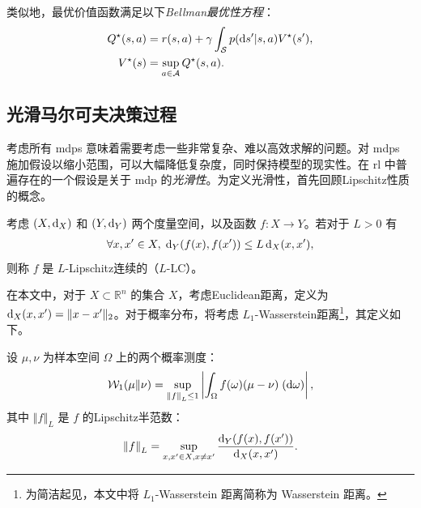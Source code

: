 类似地，最优价值函数满足以下\emph{Bellman最优性方程}：
\begin{align}
    Q^\star(s,a) &= r(s,a) + \gamma  \int_\statespace  \transitionfunction(\de s'\vert s,a)V^\star(s'),
    \label{eq:bellman_optimal_equation_Q}\\
    V^\star(s) &= \sup_{a\in\actionspace} Q^\star(s,a).
    \label{eq:bellman_optimal_equation_V}
\end{align}


\subsection{光滑马尔可夫决策过程}
\label{subsec:smooth_mdp}

考虑所有 \glspl{mdp} 意味着需要考虑一些非常复杂、难以高效求解的问题。对 \glspl{mdp} 施加假设以缩小范围，可以大幅降低复杂度，同时保持模型的现实性。在 \gls{rl} 中普遍存在的一个假设是关于 \gls{mdp} 的\emph{光滑性}。为定义光滑性，首先回顾Lipschitz性质的概念。

\begin{defi}[Lipschitz连续性]
    考虑 $(X,\distance_X)$ 和 $(Y,\distance_Y)$ 两个度量空间，以及函数 $f:X \rightarrow Y$。若对于 $L>0$ 有
    \begin{align*}
        \forall x,x'\in X,\; \distance_Y(f(x),f(x'))\leq L \distance_X(x,x'),
    \end{align*}
    则称 $f$ 是 $L$-Lipschitz连续的（$L$-LC）。
\end{defi}

在本文中，对于 $X\subset \mathbb{R}^n$ 的集合 $X$，考虑Euclidean距离，定义为 $\distance_{X}(x,x')=\lVert x-x'\rVert_2$。对于概率分布，将考虑 $L_1$-Wasserstein距离\footnote{为简洁起见，本文中将 $L_1$-Wasserstein 距离简称为 Wasserstein 距离。}，其定义如下。

\begin{defi}
    设 $\mu,\nu$ 为样本空间 $\Omega$ 上的两个概率测度：
    \begin{align*}
        \wassersteindistance[1](\mu\Vert \nu)=\sup_{\left\Vert f\right\Vert_L\leq 1} \left\vert \int_{\Omega} f(\omega)(\mu-\nu)\; (\de \omega) \right\vert,
    \end{align*}
    其中 $\left\Vert f\right\Vert_L$ 是 $f$ 的Lipschitz半范数：
    \begin{align*}
        \left\Vert f\right\Vert_L=\sup_{x,x'\in X, x\neq x'} \frac{\distance_Y(f(x),f(x'))}{\distance_X(x,x')}.
    \end{align*}
\end{defi}


